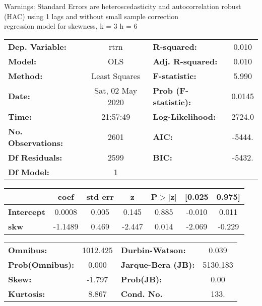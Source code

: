 Warnings: \newline
 [1] Standard Errors are heteroscedasticity and autocorrelation robust (HAC) using 1 lags and without small sample correction\\ 

regression model for skewness, k = 3 h = 6\begin{center}
\begin{tabular}{lclc}
\toprule
\textbf{Dep. Variable:}    &       rtrn       & \textbf{  R-squared:         } &     0.010   \\
\textbf{Model:}            &       OLS        & \textbf{  Adj. R-squared:    } &     0.010   \\
\textbf{Method:}           &  Least Squares   & \textbf{  F-statistic:       } &     5.990   \\
\textbf{Date:}             & Sat, 02 May 2020 & \textbf{  Prob (F-statistic):} &   0.0145    \\
\textbf{Time:}             &     21:57:49     & \textbf{  Log-Likelihood:    } &    2724.0   \\
\textbf{No. Observations:} &        2601      & \textbf{  AIC:               } &    -5444.   \\
\textbf{Df Residuals:}     &        2599      & \textbf{  BIC:               } &    -5432.   \\
\textbf{Df Model:}         &           1      & \textbf{                     } &             \\
\bottomrule
\end{tabular}
\begin{tabular}{lcccccc}
                   & \textbf{coef} & \textbf{std err} & \textbf{z} & \textbf{P$> |$z$|$} & \textbf{[0.025} & \textbf{0.975]}  \\
\midrule
\textbf{Intercept} &       0.0008  &        0.005     &     0.145  &         0.885        &       -0.010    &        0.011     \\
\textbf{skw}       &      -1.1489  &        0.469     &    -2.447  &         0.014        &       -2.069    &       -0.229     \\
\bottomrule
\end{tabular}
\begin{tabular}{lclc}
\textbf{Omnibus:}       & 1012.425 & \textbf{  Durbin-Watson:     } &    0.039  \\
\textbf{Prob(Omnibus):} &   0.000  & \textbf{  Jarque-Bera (JB):  } & 5130.183  \\
\textbf{Skew:}          &  -1.797  & \textbf{  Prob(JB):          } &     0.00  \\
\textbf{Kurtosis:}      &   8.867  & \textbf{  Cond. No.          } &     133.  \\
\bottomrule
\end{tabular}
\end{center}

